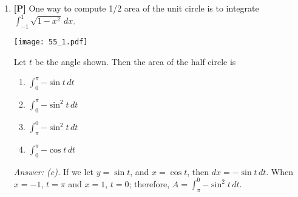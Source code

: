 \documentclass[12pt]{article}
\begin{document}
\begin{enumerate}
{\it Answer: (d).} This is an application of the previous problem. $\displaystyle{A(t)=\pi r^2=\pi (\ln (t+2))^2}$; at $t=0$, $r(t)=\ln 2$, and at $t=1$, $r(t)=\ln 3$. Then (a) clearly follows. 
(b) holds since $\displaystyle {A^{\prime}(r)=2\pi r}$, and thus $\displaystyle{\Delta A=\int_{\ln 2}^{\ln 3} A^{\prime}(r)\, dr}$. 
(c) follows from $\displaystyle{\Delta A=\int_0^1 A^{\prime}(t)\, dt}$. 

\bigskip

\item {\bf [P]} One way to compute 1/2 area of the unit circle is to integrate $\displaystyle{\int_{-1}^1 {\sqrt{1-x^2}} \, dx}$.

\begin{center}
\texttt{[image: 55\_1.pdf]}
\end{center}

Let $t$ be the angle shown. Then the area of the half circle is
\begin {enumerate}
\item $\displaystyle{\int_0^{\pi} {-\sin t} \, dt}$
\item $\displaystyle{\int_0^{\pi} {-\sin^2 t} \, dt}$
\item $\displaystyle{\int_{\pi}^0 {-\sin^2 t}\, dt}$
\item $\displaystyle{\int_0^{\pi} {-\cos t} \, dt}$
\end{enumerate}

{\it Answer: (c).} If we let $y=\sin t$, and $x=\cos t$, then $dx=-\sin t \, dt$. When $x=-1$, $t=\pi$ and $x=1$, $t=0$; therefore,
$\displaystyle{A=\int_{\pi}^0 {-\sin ^2 t}\, dt}$.

\end{enumerate}
\end{document}
